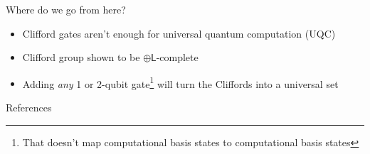 \documentclass[11pt,aspectratio=1610]{beamer}
\begin{document}
\begin{frame}{Where do we go from here?}
	\begin{itemize}[<+->]
		\item Clifford gates aren't enough for universal quantum computation (UQC)
		\item Clifford group shown to be $\oplus\bm{\mathsf{L}}$-complete \cite{aaronson}
		\item Adding \emph{any} 1 or 2-qubit gate\footnote{That doesn't map computational basis states to computational basis states} will turn the Cliffords into a universal set \cite{shi}
	\end{itemize}
\end{frame}












\begin{frame}[allowframebreaks]{References}

	
	

\end{frame}
\end{document}
